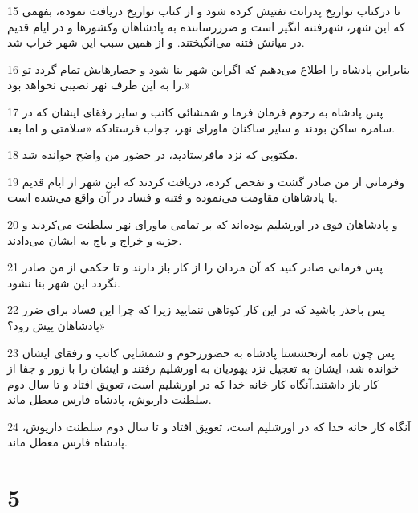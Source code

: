 \par 15 تا درکتاب تواریخ پدرانت تفتیش کرده شود و از کتاب تواریخ دریافت نموده، بفهمی که این شهر، شهرفتنه انگیز است و ضرررساننده به پادشاهان وکشورها و در ایام قدیم در میانش فتنه می‌انگیختند. و از همین سبب این شهر خراب شد.
\par 16 بنابراین پادشاه را اطلاع می‌دهیم که اگراین شهر بنا شود و حصارهایش تمام گردد تو را به این طرف نهر نصیبی نخواهد بود.»
\par 17 پس پادشاه به رحوم فرمان فرما و شمشائی کاتب و سایر رفقای ایشان که در سامره ساکن بودند و سایر ساکنان ماورای نهر، جواب فرستادکه «سلامتی و اما بعد.
\par 18 مکتوبی که نزد مافرستادید، در حضور من واضح خوانده شد.
\par 19 وفرمانی از من صادر گشت و تفحص کرده، دریافت کردند که این شهر از ایام قدیم با پادشاهان مقاومت می‌نموده و فتنه و فساد در آن واقع می‌شده است.
\par 20 و پادشاهان قوی در اورشلیم بوده‌اند که بر تمامی ماورای نهر سلطنت می‌کردند و جزیه و خراج و باج به ایشان می‌دادند.
\par 21 پس فرمانی صادر کنید که آن مردان را از کار باز دارند و تا حکمی از من صادر نگردد این شهر بنا نشود.
\par 22 پس باحذر باشید که در این کار کوتاهی ننمایید زیرا که چرا این فساد برای ضرر پادشاهان پیش رود؟»
\par 23 پس چون نامه ارتحشستا پادشاه به حضوررحوم و شمشایی کاتب و رفقای ایشان خوانده شد، ایشان به تعجیل نزد یهودیان به اورشلیم رفتند و ایشان را با زور و جفا از کار باز داشتند.آنگاه کار خانه خدا که در اورشلیم است، تعویق افتاد و تا سال دوم سلطنت داریوش، پادشاه فارس معطل ماند.
\par 24 آنگاه کار خانه خدا که در اورشلیم است، تعویق افتاد و تا سال دوم سلطنت داریوش، پادشاه فارس معطل ماند.
 
\chapter{5}

